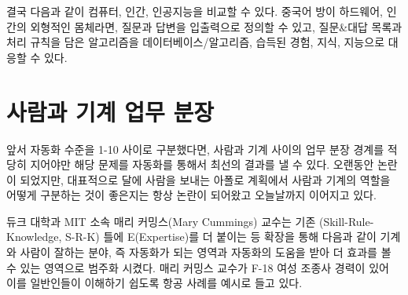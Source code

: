 \documentclass[smallextended]{svjour3}       %
\begin{document}
결국 다음과 같이 컴퓨터, 인간, 인공지능을 비교할 수 있다. 중국어 방이
하드웨어, 인간의 외형적인 몸체라면, 질문과 답변을 입출력으로 정의할 수
있고, 질문\&대답 목록과 처리 규칙을 담은 알고리즘을
데이터베이스/알고리즘, 습득된 경험, 지식, 지능으로 대응할 수 있다.

\begin{table}[H]
\centering
{}
\end{table}

\hypertarget{man-human-boundary}{%
\section{사람과 기계 업무 분장}\label{man-human-boundary}}

앞서 자동화 수준을 1-10 사이로 구분했다면, 사람과 기계 사이의 업무 분장
경계를 적당히 지어야만 해당 문제를 자동화를 통해서 최선의 결과를 낼 수
있다. 오랜동안 논란이 되었지만, 대표적으로 달에 사람을 보내는 아폴로
계획에서 사람과 기계의 역할을 어떻게 구분하는 것이 좋은지는 항상 논란이
되어왔고 오늘날까지 이어지고 있다.

듀크 대학과 MIT 소속 매리 커밍스(Mary Cummings) 교수는 기존
(Skill-Rule-Knowledge, S-R-K) 틀에 E(Expertise)를 더 붙이는 등 확장을
통해 다음과 같이 기계와 사람이 잘하는 분야, 즉 자동화가 되는 영역과
자동화의 도움을 받아 더 효과를 볼 수 있는 영역으로 범주화 시켰다. 매리
커밍스 교수가 F-18 여성 조종사 경력이 있어 이를 일반인들이 이해하기
쉽도록 항공 사례를 예시로 들고 있다.

\begin{table}[H]
\centering
{}
\end{table}
\end{document}
